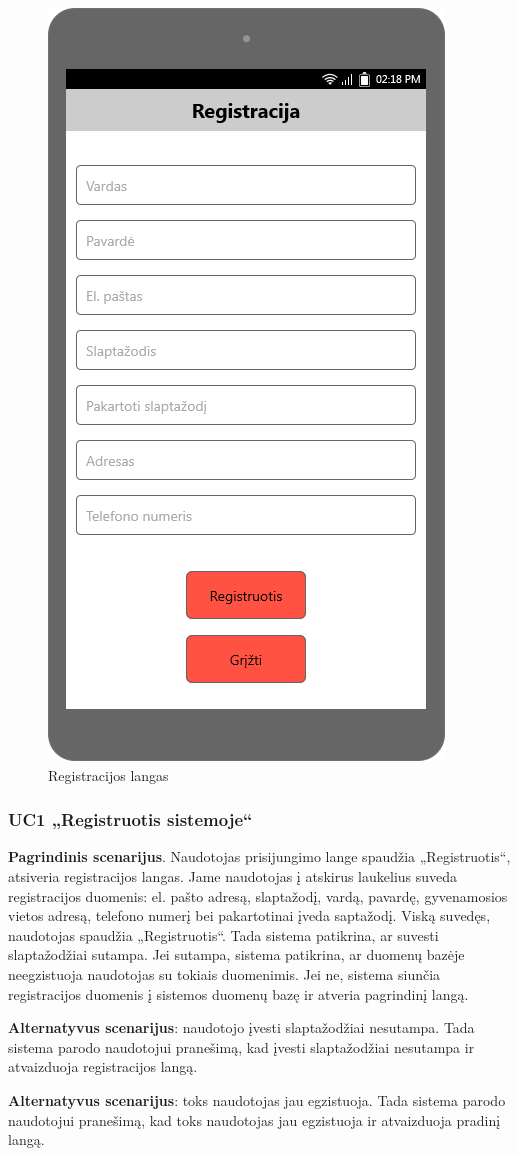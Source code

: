 \documentclass{VUMIFPSbakalaurinis}
\begin{document}
\begin{figure}[H]
	\centering
	\includegraphics[scale=0.4]{img/ScreenShots/02-Registracijos-langas}
	\caption{Registracijos langas}
	\label{img:reg}
\end{figure}
\subsubsection{UC1 „Registruotis sistemoje“}
\textbf{Pagrindinis scenarijus}. Naudotojas prisijungimo lange spaudžia „Registruotis“, atsiveria registracijos langas. Jame naudotojas į atskirus laukelius suveda registracijos duomenis: el. pašto adresą, slaptažodį, vardą, pavardę, gyvenamosios vietos adresą, telefono numerį bei pakartotinai įveda saptažodį. Viską suvedęs, naudotojas spaudžia „Registruotis“. Tada sistema patikrina, ar suvesti slaptažodžiai sutampa. Jei sutampa, sistema patikrina, ar duomenų bazėje neegzistuoja naudotojas su tokiais duomenimis. Jei ne, sistema siunčia registracijos duomenis į sistemos duomenų bazę ir atveria pagrindinį langą.
\par \textbf{Alternatyvus scenarijus}: naudotojo įvesti slaptažodžiai nesutampa. Tada sistema parodo naudotojui pranešimą, kad įvesti slaptažodžiai nesutampa ir atvaizduoja registracijos langą.
\par \textbf{Alternatyvus scenarijus}: toks naudotojas jau egzistuoja. Tada sistema parodo naudotojui pranešimą, kad toks naudotojas jau egzistuoja ir atvaizduoja pradinį langą.
\end{document}
